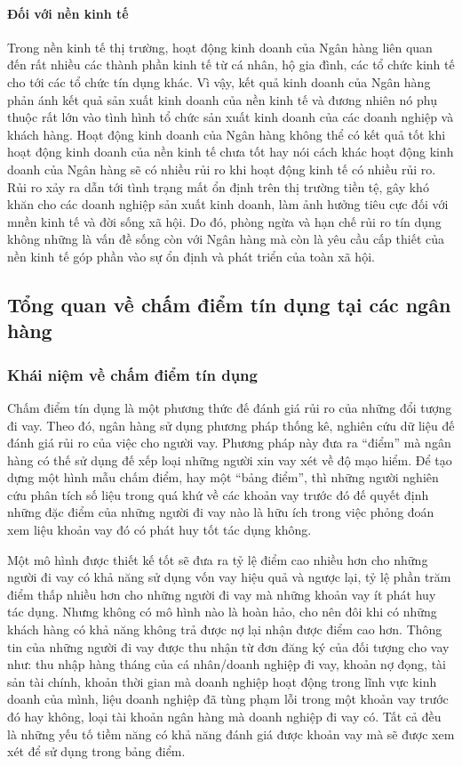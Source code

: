 \paragraph{Đối với nền kinh tế}
Trong nền kinh tế thị trường, hoạt động kinh doanh của Ngân hàng liên quan đến rất nhiều các thành phần kinh tế từ cá nhân, hộ gia đình, các tổ chức kinh tế cho tới các tổ chức tín dụng khác. Vì vậy, kết quả kinh doanh của Ngân hàng phản ánh kết quả sản xuất kinh doanh của nền kinh tế và đương nhiên nó phụ thuộc rất lớn vào tình hình tổ chức sản xuất kinh doanh của các doanh nghiệp và khách hàng. Hoạt động kinh doanh của Ngân hàng không thể có kết quả tốt khi hoạt động kinh doanh của nền kinh tế chưa tốt hay nói cách khác hoạt động kinh doanh của Ngân hàng sẽ có nhiều rủi ro khi hoạt động kinh tế có nhiều rủi ro. Rủi ro xảy ra dẫn tới tình trạng mất ổn định trên thị trường tiền tệ, gây khó khăn cho các doanh nghiệp sản xuất kinh doanh, làm ảnh hưởng tiêu cực đối với mnền kinh tế và đời sống xã hội. Do đó, phòng ngừa và hạn chế rủi ro tín dụng không những là vấn đề sống còn với Ngân hàng mà còn là yêu cầu cấp thiết của nền kinh tế góp phần vào sự ổn định và phát triển của toàn xã hội.



\subsection{Tổng quan về chấm điểm tín dụng tại các ngân hàng}
\subsubsection{Khái niệm về chấm điểm tín dụng}
Chấm điểm tín dụng là một phương thức đế đánh giá rủi ro của những đổi tượng đi vay. 
Theo đó, ngân hàng sử dụng phương pháp thống kê, nghiên cứu dữ liệu đế đánh giá rủi ro của việc cho người vay. 
Phương pháp này đưa ra “điểm” mà ngân hàng có thế sử dụng đế xếp loại những người xin vay xét về độ mạo hiểm. Để tạo dựng một hình mẫu chấm điểm, hay một “bảng điểm”, thì những người nghiên cứu phân tích số liệu trong quá khứ về các khoản vay trước đó đế quyết định những đặc điểm của những người đi vay nào là hữu ích trong việc phỏng đoán xem liệu khoản vay đó có phát huy tốt tác dụng không.

Một mô hình được thiết kế tốt sẽ đưa ra tỷ lệ điểm cao nhiều hơn cho những người đi vay có khả năng sử dụng vốn vay hiệu quả và ngược lại, tỷ lệ phần trăm điểm thấp nhiều hơn cho những người đi vay mà những khoản vay ít phát huy tác dụng. Nhưng không có mô hình nào là hoàn hảo, cho nên đôi khi có những khách hàng có khả năng không trả được nợ lại nhận được điểm cao hơn.
Thông tin của những người đi vay được thu nhận từ đơn đăng ký của đối tượng cho vay như: thu nhập hàng tháng của cá nhân/doanh nghiệp đi vay, khoản nợ đọng, tài sản tài chính, khoản thời gian mà doanh nghiệp hoạt động trong lĩnh vực kinh doanh của mình, liệu doanh nghiệp đã tùng phạm lỗi trong một khoản vay trước đó hay không, loại tài khoản ngân hàng mà doanh nghiệp đi vay có. Tất cả đều là những yếu tố tiềm năng có khả năng đánh giá được khoản vay mà sẽ được xem xét để sử dụng trong bảng điểm.

